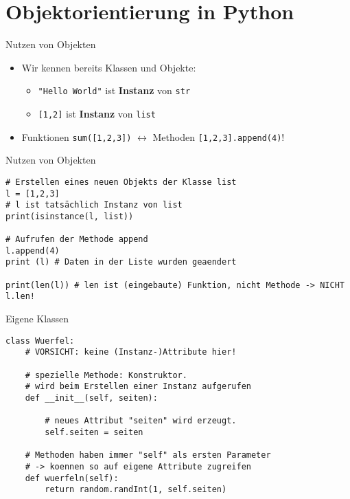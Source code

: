 
\section{Objektorientierung in Python}
\begin{frame}{Nutzen von Objekten}
    \begin{itemize}
        \item Wir kennen bereits Klassen und Objekte:
        \begin{itemize}
            \item \texttt{"Hello World"} ist \textbf{Instanz} von \texttt{str}
            \item \texttt{[1,2]} ist \textbf{Instanz} von \texttt{list}
        \end{itemize}
        \item Funktionen \texttt{sum([1,2,3])} $\leftrightarrow$ Methoden \texttt{[1,2,3].append(4)}!
    \end{itemize} 
\end{frame}

\begin{frame}[fragile]{Nutzen von Objekten}
    \begin{lstlisting}
# Erstellen eines neuen Objekts der Klasse list
l = [1,2,3]
# l ist tatsächlich Instanz von list
print(isinstance(l, list))

# Aufrufen der Methode append
l.append(4)
print (l) # Daten in der Liste wurden geaendert

print(len(l)) # len ist (eingebaute) Funktion, nicht Methode -> NICHT l.len!
    \end{lstlisting}
\end{frame}

\begin{frame}[fragile]{Eigene Klassen}
    \begin{lstlisting}
class Wuerfel:
    # VORSICHT: keine (Instanz-)Attribute hier!

    # spezielle Methode: Konstruktor. 
    # wird beim Erstellen einer Instanz aufgerufen
    def __init__(self, seiten):

        # neues Attribut "seiten" wird erzeugt.
        self.seiten = seiten

    # Methoden haben immer "self" als ersten Parameter
    # -> koennen so auf eigene Attribute zugreifen
    def wuerfeln(self):
        return random.randInt(1, self.seiten)
    \end{lstlisting}
\end{frame}


